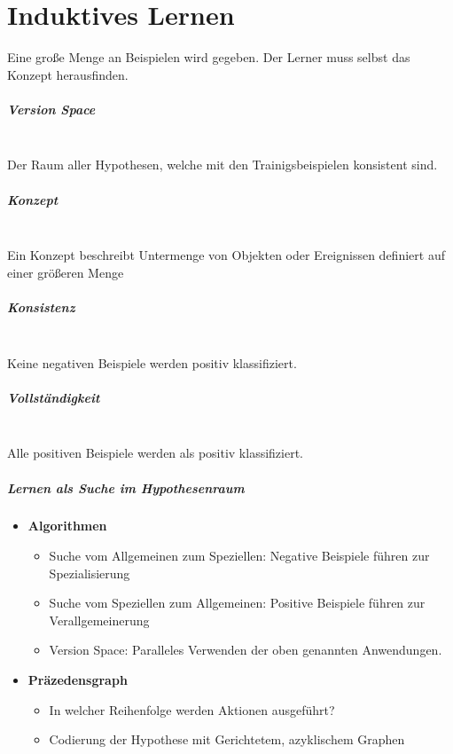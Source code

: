 \chapter{Induktives Lernen}
Eine große Menge an Beispielen wird gegeben. Der Lerner muss selbst das Konzept herausfinden.

\paragraph{Version Space} \mbox{} \\
Der Raum aller Hypothesen, welche mit den Trainigsbeispielen konsistent sind.

\paragraph{Konzept} \mbox{} \\
Ein Konzept beschreibt Untermenge von Objekten oder Ereignissen definiert auf
einer größeren Menge

\paragraph{Konsistenz} \mbox{} \\
Keine negativen Beispiele werden positiv klassifiziert.

\paragraph{Vollständigkeit} \mbox{} \\
Alle positiven Beispiele werden als positiv klassifiziert.

\paragraph{Lernen als Suche im Hypothesenraum} \mbox{}
\begin{itemize}
    \item \textbf{Algorithmen}
    \begin{itemize}
        \item Suche vom Allgemeinen zum Speziellen: Negative Beispiele führen zur
        Spezialisierung
        \item Suche vom Speziellen zum Allgemeinen: Positive Beispiele führen zur
        Verallgemeinerung
        \item Version Space: Paralleles Verwenden der oben genannten Anwendungen.
    \end{itemize}
    \item \textbf{Präzedensgraph}
    \begin{itemize}
        \item In welcher Reihenfolge werden Aktionen ausgeführt?
        \item Codierung der Hypothese mit Gerichtetem, azyklischem Graphen
    \end{itemize}
\end{itemize}


